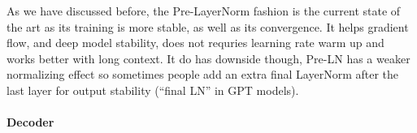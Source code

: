\documentclass[11pt]{article}  %
\begin{document}
As we have discussed before, the Pre-LayerNorm fashion is the current state of the art as its training is more stable, as well as its convergence. 
It helps gradient flow, and deep model stability, does not requries learning rate warm up and works better with long context.
It do has downside though, Pre-LN has a weaker normalizing effect so sometimes people add an extra final LayerNorm after the last layer for output stability (``final LN'' in GPT models).

\paragraph{Decoder}
\end{document}
